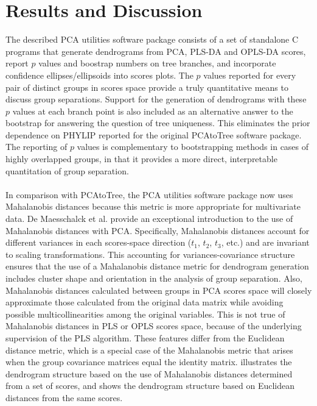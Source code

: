 \section{Results and Discussion}

\begin{doublespace}
The described PCA utilities software package consists of a set of standalone
C programs that generate dendrograms from PCA, PLS-DA and OPLS-DA scores,
report $p$ values and boostrap numbers on tree branches, and incorporate
confidence ellipses/ellipsoids into scores plots. The $p$ values reported for
every pair of distinct groups in scores space provide a truly quantitative
means to discuss group separations. Support for the generation of dendrograms
with these $p$ values at each branch point is also included as an alternative
answer to the bootstrap for answering the question of tree uniqueness. This
eliminates the prior dependence on PHYLIP \cite{retief:mmbio2000}
reported for the original PCAtoTree \cite{werth:abio2010} software
package. The reporting of $p$ values is complementary to bootstrapping methods
in cases of highly overlapped groups, in that it provides a more direct,
interpretable quantitation of group separation.
\\\\
In comparison with PCAtoTree, the PCA utilities software package now uses
Mahalanobis distances because this metric is more appropriate for multivariate
data. De Maesschalck et al. \cite{demaesschalck:cils2000} provide an
exceptional introduction to the use of Mahalanobis distances with PCA.
Specifically, Mahalanobis distances account for different variances in each
scores-space direction ($t_1$, $t_2$, $t_3$, etc.) and are invariant
to scaling transformations. This accounting for variances-covariance structure
ensures that the use of a Mahalanobis distance metric for dendrogram generation
includes cluster shape and orientation in the analysis of group separation.
Also, Mahalanobis distances calculated between groups in PCA scores space will
closely approximate those calculated from the original data matrix while
avoiding possible multicollinearities among the original variables. This is
not true of Mahalanobis distances in PLS or OPLS scores space, because of the
underlying supervision of the PLS algorithm. These features differ from the
Euclidean distance metric, which is a special case of the Mahalanobis metric
that arises when the group covariance matrices equal the identity matrix.
 illustrates the dendrogram structure based on the
use of Mahalanobis distances determined from a set of scores, and
 shows the dendrogram structure based on
Euclidean distances from the same scores.
\end{doublespace}

